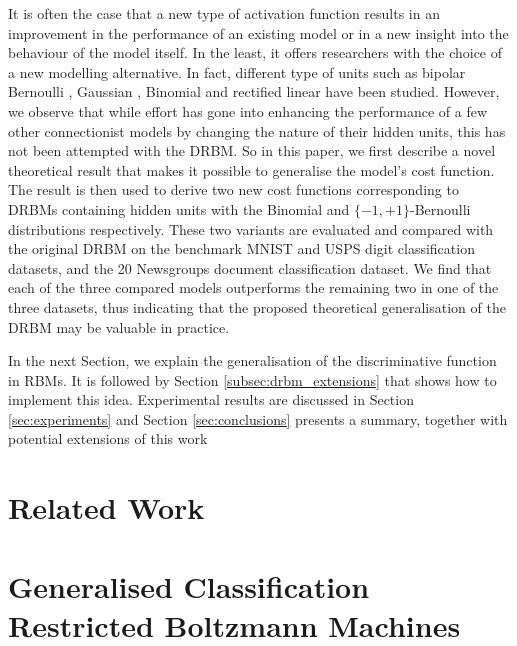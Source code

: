 \documentclass[review]{elsarticle}
\begin{document}
It is often the case that a new type of activation function results in
an improvement in the performance of an existing model or in a new
insight into the behaviour of the model itself.  In the least, it
offers researchers with the choice of a new modelling alternative. In
fact, different type of units such as bipolar Bernoulli
\cite{Freund1992}, Gaussian \cite{Welling2004}, Binomial
\cite{Teh2001} and rectified linear \cite{Nair2010} have been
studied. However, we observe that while effort has gone into enhancing
the performance of a few other connectionist models by changing the
nature of their hidden units, this has not been attempted with the
DRBM.  So in this paper, we first describe a novel theoretical result
that makes it possible to generalise the model's cost function.  The
result is then used to derive two new cost functions corresponding to
DRBMs containing hidden units with the Binomial and $\{-1,
+1\}$-Bernoulli distributions respectively.  These two variants are
evaluated and compared with the original DRBM on the benchmark MNIST
and USPS digit classification datasets, and the 20 Newsgroups document
classification dataset.  We find that each of the three compared
models outperforms the remaining two in one of the three datasets,
thus indicating that the proposed theoretical generalisation of the
DRBM may be valuable in practice.
    
In the next Section, we explain the generalisation of the
discriminative function in RBMs. It is followed by Section
\ref{subsec:drbm_extensions} that shows how to implement this
idea. Experimental results are discussed in Section
\ref{sec:experiments} and Section \ref{sec:conclusions} presents a
summary, together with potential extensions of this work

\section{Related Work}
\label{sec:relate}


\section{Generalised Classification Restricted Boltzmann Machines}
\end{document}
